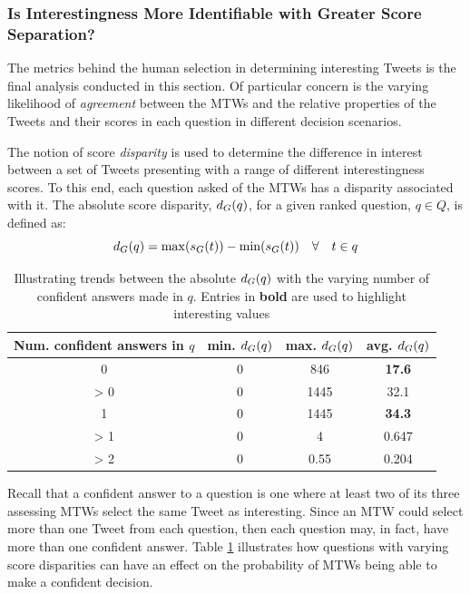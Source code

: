 \subsubsection{Is Interestingness More Identifiable with Greater Score Separation?}
The metrics behind the human selection in determining interesting Tweets is the final analysis conducted in this section. Of particular concern is the varying likelihood of \textit{agreement} between the MTWs and the relative properties of the Tweets and their scores in each question in different decision scenarios.

The notion of score \textit{disparity} is used to determine the difference in interest between a set of Tweets presenting with a range of different interestingness scores. To this end, each question asked of the MTWs has a disparity associated with it. The absolute score disparity, $d_G(q)$, for a given ranked question, $q \in Q$, is defined as:
\[
    d_G(q) = \max(s_G(t)) - \min(s_G(t)) \quad \forall \quad t \in q
\]

\begin{table}[h]\footnotesize
\centering
\begin{tabular}{ c | c | c | c }
	 Num. confident answers in $q$ & min. $d_G(q)$ & max. $d_G(q)$ & avg. $d_G(q)$ \\
	 \hline
     \hline
	0 & 0 & 846 & \textbf{17.6} \\
	> 0 & 0 & 1445 & 32.1 \\
	1 & 0 & 1445 & \textbf{34.3} \\
	> 1 & 0 & 4 & 0.647 \\
	> 2 & 0 & 0.55 & 0.204\\
     \hline
\end{tabular}
\caption{Illustrating trends between the absolute $d_G(q)$ with the varying number of confident answers made in $q$. Entries in \textbf{bold} are used to highlight interesting values}
\label{table:score_disparities}
\end{table}

Recall that a confident answer to a question is one where at least two of its three assessing MTWs select the same Tweet as interesting. Since an MTW could select more than one Tweet from each question, then each question may, in fact, have more than one confident answer. Table \ref{table:score_disparities} illustrates how questions with varying score disparities can have an effect on the probability of MTWs being able to make a confident decision.


